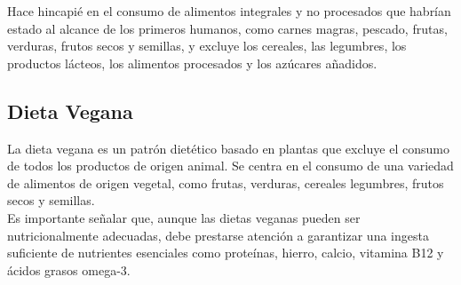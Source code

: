 \documentclass[12pt,a4paper]{article}
\begin{document}
Hace hincapié en el consumo de alimentos integrales y no procesados 
que habrían estado al alcance de los primeros humanos, como carnes magras, 
pescado, frutas, verduras, frutos secos y semillas, y excluye los cereales, 
las legumbres, los productos lácteos, los alimentos procesados y los 
azúcares añadidos.

\subsection{Dieta Vegana}
\cite{marvastipopular} La dieta vegana es un patrón dietético basado en 
plantas que excluye el consumo de todos los productos de origen animal. Se 
centra en el consumo de una variedad de alimentos de origen vegetal, como 
frutas, verduras, cereales legumbres, frutos secos y semillas.\\

Es importante señalar que, aunque las dietas veganas pueden ser 
nutricionalmente adecuadas, debe prestarse atención a garantizar una 
ingesta suficiente de nutrientes esenciales como proteínas, hierro, 
calcio, vitamina B12 y ácidos grasos omega-3.

\newpage

\printbibliography[title={Referencias}]
\end{document}
